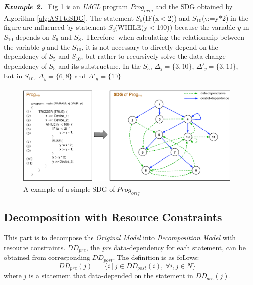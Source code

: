 \textbf{\emph{Example 2.}} \ Fig \ref{fig_SDG_exapmle} is an \emph{IMCL} program $Prog_{orig}$ and the SDG obtained by Algorithm \ref{alg:ASTtoSDG}. The statement $S_{5}$(IF(x$<$2)) and $S_{10}$(y:=y$\ast$2) in the figure are influenced by statement $S_{4}$(WHILE(y$<$100)) because the variable $y$ in $S_{10}$ depends on $S_{6}$ and $S_{8}$. Therefore, when calculating the relationship between the variable $y$ and the $S_{10}$, it is not necessary to directly depend on the dependency of $S_{5}$ and $S_{10}$, but rather to recursively solve the data change dependency of $S_{5}$ and its substructure. In the $S_{5}$, $\Delta_{y}=\{3, 10\}$, $\Delta'_{y}=\{3, 10\}$, but in $S_{10}$, $\Delta_{y}=\{6,8\}$ and $\Delta'_{y} = \{10\}$.

\begin{figure}[!hpbt]
    \centering
        \includegraphics[height=2.0in, width=4.4in]{fig_SDG_exapmle}
    \caption{A example of a simple SDG of $Prog_{orig}$}\label{fig_SDG_exapmle}
\end{figure}


\subsection{Decomposition with Resource Constraints}
This part is to decompose the \emph{Original Model} into \emph{Decomposition Model} with resource constraints. $DD_{pre}$, the \emph{pre} data-dependency for each statement, can be obtained from corresponding $DD_{post}$. The definition is as follows:
\begin{displaymath}
    DD_{pre}(j) \ = \ \{ i \ | \ j \in DD_{post}(i), \ \forall i, j \in N \}
\end{displaymath}
where $j$ is a statement that data-depended on the statement in $DD_{pre}(j)$.



